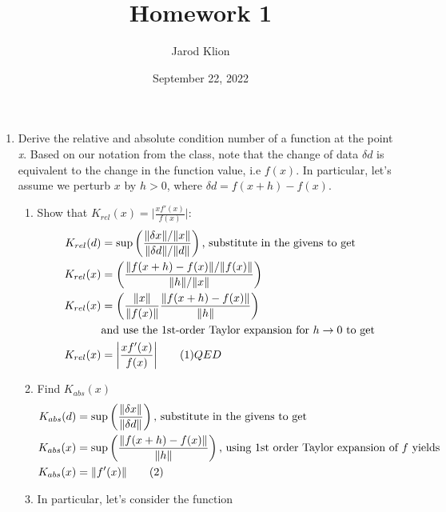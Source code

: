 \documentclass[10pt]{article}
\title{Homework 1}
\author{Jarod Klion}
\date{September 22, 2022}
\newcommand{\norm}[1]{\lVert#1\rVert}
\newcommand\numberthis{\addtocounter{equation}{1}\tag{\theequation}}
\begin{document}
\maketitle



\begin{enumerate} 
\item Derive the relative and absolute condition number of a function at the point \emph{x}. Based on our notation from the class, note that the change of data $\delta d$ is equivalent to the change in the function value, i.e $f(x)$. In particular, let's assume we perturb $x$ by $h > 0$, where $\delta d = f(x + h) - f(x)$.
	\begin{enumerate}[label=(\alph*)]
		\item Show that $K_{rel} (x) = \bigg | \frac{xf'(x)}{f(x)} \bigg |$:
			\begin{align*}
				K_{rel}(d) &= \mbox{sup} \left( \frac{\norm{\delta x} / \norm{x}}{\norm{\delta d} / \norm{d}} \right) \mbox{, substitute in the givens to get} \\
				K_{rel}(x) &= \left( \frac{\norm{f(x+h) - f(x)} / \norm{f(x)}}{\norm{h} / \norm{x}} \right)  \\
				K_{rel}(x) &= \left( \frac{\norm{x}}{\norm{f(x)}}\frac{\norm{f(x+h) - f(x)}}{\norm{h}} \right) \\ 
				&\mbox{and use the 1st-order Taylor expansion for $h \rightarrow 0$ to get}\\ 
				K_{rel}(x) &= \bigg \lvert \frac{xf'(x)}{f(x)} \bigg \rvert \numberthis QED
			\end{align*}
		\item Find $K_{abs}(x)$
			\begin{align*}
				K_{abs}(d) &= \mbox{sup} \left(\frac{\norm{\delta x}}{\norm{\delta d}} \right) \mbox{, substitute in the givens to get}\\
				K_{abs}(x) &= \mbox{sup} \left(\frac{\norm{f(x+h) - f(x)}}{\norm{h}} \right) \mbox{, using 1st order Taylor expansion of $f$ yields} \\
				K_{abs}(x) &= \norm{f'(x)} \numberthis
			\end{align*}
		\item In particular, let's consider the function
			\begin{equation*}

\end{equation*}
\end{enumerate}
\end{enumerate}
\end{document}
